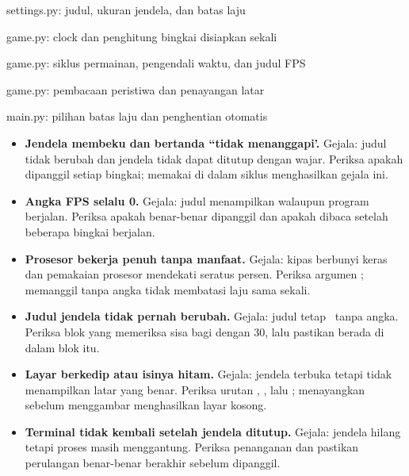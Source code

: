   {settings.py: judul, ukuran jendela, dan batas laju}

  {game.py: clock dan penghitung bingkai disiapkan sekali}

  {game.py: siklus permainan, pengendali waktu, dan judul FPS}

  {game.py: pembacaan peristiwa dan penayangan latar}

  {main.py: pilihan batas laju dan penghentian otomatis}



\begin{galatbox}
\begin{itemize}[leftmargin=1.4em, itemsep=0.35em]
  \item \textbf{Jendela membeku dan bertanda ``tidak menanggapi'.}
        Gejala: judul tidak berubah dan jendela tidak dapat ditutup dengan
        wajar. Periksa apakah  dipanggil setiap
        bingkai; memakai  di dalam siklus menghasilkan
        gejala ini.
  \item \textbf{Angka FPS selalu 0.}
        Gejala: judul menampilkan  walaupun program berjalan.
        Periksa apakah  benar-benar dipanggil dan apakah
         dibaca setelah beberapa bingkai berjalan.
  \item \textbf{Prosesor bekerja penuh tanpa manfaat.}
        Gejala: kipas berbunyi keras dan pemakaian prosesor mendekati
        seratus persen. Periksa argumen ; memanggil
         tanpa angka tidak membatasi laju sama sekali.
  \item \textbf{Judul jendela tidak pernah berubah.}
        Gejala: judul tetap \NamaPermainan\ tanpa angka. Periksa blok
        yang memeriksa sisa bagi  dengan 30, lalu pastikan
         berada di dalam blok itu.
  \item \textbf{Layar berkedip atau isinya hitam.}
        Gejala: jendela terbuka tetapi tidak menampilkan latar yang benar.
        Periksa urutan , , lalu ;
        menayangkan sebelum menggambar menghasilkan layar kosong.
  \item \textbf{Terminal tidak kembali setelah jendela ditutup.}
        Gejala: jendela hilang tetapi proses masih menggantung. Periksa
        penanganan  dan pastikan perulangan benar-benar berakhir
        sebelum  dipanggil.
\end{itemize}
\end{galatbox}

